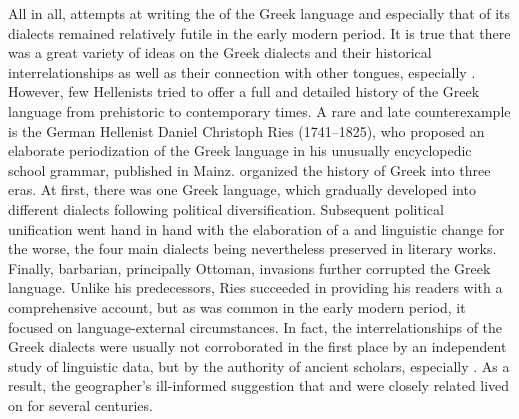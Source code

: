 All in all, attempts at writing the  of the Greek language and especially that of its dialects remained relatively futile in the early modern period. It is true that there was a great variety of ideas on the Greek dialects and their historical interrelationships as well as their connection with other tongues, especially . However, few Hellenists tried to offer a full and detailed history of the Greek language from prehistoric to contemporary times. A rare and late counterexample is the German Hellenist Daniel Christoph Ries (1741–1825), who proposed an elaborate periodization of the Greek language in his unusually encyclopedic school grammar, published in Mainz. \citet[199--202]{Ries1786} organized the history of Greek into three eras. At first, there was one Greek language, which gradually developed into different dialects following political diversification. Subsequent political unification went hand in hand with the elaboration of a  and linguistic change for the worse, the four main dialects being nevertheless preserved in literary works. Finally, barbarian, principally Ottoman, invasions further corrupted the Greek language. Unlike his predecessors, Ries succeeded in providing his readers with a comprehensive account, but as was common in the early modern period, it focused on language-external circumstances. In fact, the interrelationships of the Greek dialects were usually not corroborated in the first place by an independent study of linguistic data, but by the authority of ancient scholars, especially . As a result, the geographer’s ill-informed suggestion that  and  were closely related lived on for several centuries.

